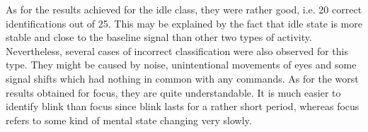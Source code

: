As for the results achieved for the idle class, they were rather good, i.e. 20 correct identifications out of 25. This may be explained by the fact that idle state is more stable and close to the baseline signal than other two types of activity. Nevertheless, several cases of incorrect classification were also observed for this type. They might be caused by noise, unintentional movements of eyes and some signal shifts which had nothing in common with any commands. As for the worst results obtained for focus, they are quite understandable. It is much easier to identify blink than focus since blink lasts for a rather short period, whereas focus refers to some kind of mental state changing very slowly.


